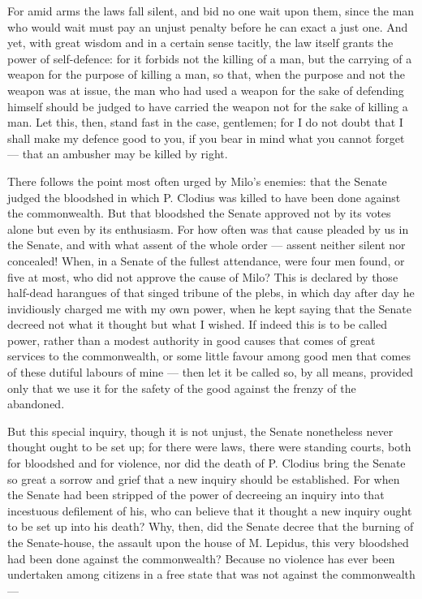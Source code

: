  For amid arms the laws fall silent, and bid no one wait upon them, since the man who would wait must pay an unjust penalty before he can exact a just one. And yet, with great wisdom and in a certain sense tacitly, the law itself grants the power of self-defence: for it forbids not the killing of a man, but the carrying of a weapon for the purpose of killing a man, so that, when the purpose and not the weapon was at issue, the man who had used a weapon for the sake of defending himself should be judged to have carried the weapon not for the sake of killing a man. Let this, then, stand fast in the case, gentlemen; for I do not doubt that I shall make my defence good to you, if you bear in mind what you cannot forget --- that an ambusher may be killed by right.

 There follows the point most often urged by Milo's enemies: that the Senate judged the bloodshed in which P. Clodius was killed to have been done against the commonwealth. But that bloodshed the Senate approved not by its votes alone but even by its enthusiasm. For how often was that cause pleaded by us in the Senate, and with what assent of the whole order --- assent neither silent nor concealed! When, in a Senate of the fullest attendance, were four men found, or five at most, who did not approve the cause of Milo? This is declared by those half-dead harangues of that singed tribune of the plebs, in which day after day he invidiously charged me with my own power, when he kept saying that the Senate decreed not what it thought but what I wished. If indeed this is to be called power, rather than a modest authority in good causes that comes of great services to the commonwealth, or some little favour among good men that comes of these dutiful labours of mine --- then let it be called so, by all means, provided only that we use it for the safety of the good against the frenzy of the abandoned.

 But this special inquiry, though it is not unjust, the Senate nonetheless never thought ought to be set up; for there were laws, there were standing courts, both for bloodshed and for violence, nor did the death of P. Clodius bring the Senate so great a sorrow and grief that a new inquiry should be established. For when the Senate had been stripped of the power of decreeing an inquiry into that incestuous defilement of his, who can believe that it thought a new inquiry ought to be set up into his death? Why, then, did the Senate decree that the burning of the Senate-house, the assault upon the house of M. Lepidus, this very bloodshed had been done against the commonwealth? Because no violence has ever been undertaken among citizens in a free state that was not against the commonwealth ---

